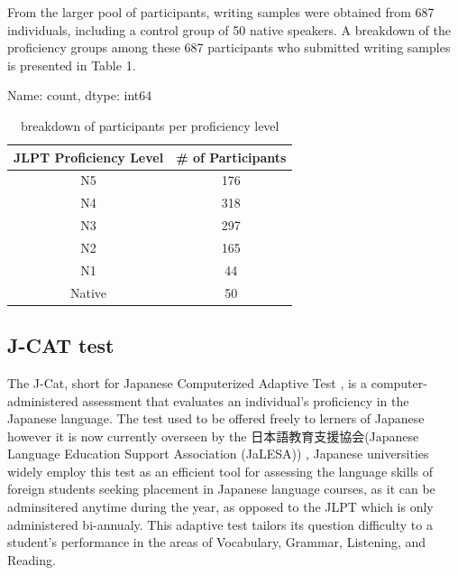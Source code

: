 From the larger pool of participants, writing samples were obtained from 687 individuals, including a control group
of 50 native speakers. A breakdown of the proficiency groups among these 687 participants who submitted writing
samples is presented in Table 1.



Name: count, dtype: int64
\begin{table}
\centering
\begin{tabular}{cc}
\hline \textbf{JLPT Proficiency Level} & \textbf{\# of Participants} \\ \hline
N5 & 176 \\
N4  & 318 \\
N3 & 297\\
N2 & 165 \\
N1 & 44 \\
Native & 50 \\
\hline
\end{tabular}
\caption{\label{participants-chart} breakdown of participants per proficiency level}
\end{table}


\subsection{J-CAT test}


The J-Cat, short for Japanese Computerized Adaptive Test \cite{Imai2009}, is a computer-administered assessment that
evaluates an
individual's proficiency in the Japanese language. The test used to be offered freely to lerners of Japanese however
it is now currently overseen by the 日本語教育支援協会(Japanese Language Education Support Association (JaLESA)) , Japanese
universities widely
employ this test as an efficient tool for assessing the language skills of foreign students seeking placement in
Japanese language courses, as it can be adminsitered anytime during the year, as opposed to the JLPT which is only
administered bi-annualy. This adaptive test tailors its
question difficulty to a
student's performance in
the areas of Vocabulary, Grammar, Listening, and Reading.

